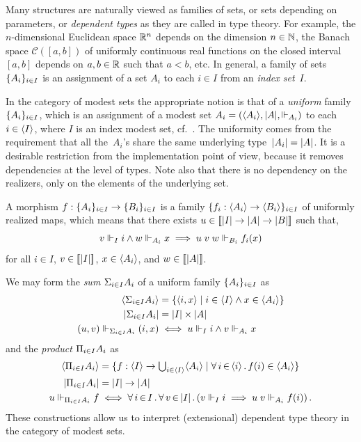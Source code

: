 Many structures are naturally viewed as families of sets, or sets
depending on parameters, or \emph{dependent types} as they are called
in type theory. For example, the $n$-dimensional Euclidean space
$\mathbb{R}^n$ depends on the dimension $n \in \mathbb{N}$, the Banach space
$\mathcal{C}([a,b])$ of uniformly continuous real functions on the
closed interval $[a,b]$ depends on $a, b \in \mathbb{R}$ such that $a < b$,
etc. In general, a family of sets $\{A_i\}_{i \in I}$ is an
assignment of a set $A_i$ to each $i \in I$ from an \emph{index
  set}~$I$.

In the category of modest sets the appropriate notion is that of a
\emph{uniform} family~$\{A_i\}_{i \in I}$, which is an assignment
of a modest set $A_i = (\langle A_i \rangle, |A|, {\Vdash_{A_i}})$ to each
$i \in \langle I \rangle$, where $I$ is an index modest set,
cf.~\cite{Jacobs,Birkedal}. The uniformity comes from the requirement
that all the~$A_i$'s share the same underlying type~$|A_i| =
|A|$. It is a desirable restriction from the implementation
point of view, because it removes dependencies at the level of types.
Note also that there is no dependency on the realizers, only on the
elements of the underlying set.

A morphism $f : \{A_i\}_{i \in I} \to \{B_i\}_{i \in I}$ is a
family $\{f_i : \langle A_i \rangle \to \langle B_i \rangle\}_{i \in I}$ of
uniformly realized maps, which means that there exists $u \in
[\![|I| \to |A| \to |B|]\!]$ such that,
%
\begin{equation*}
  v \Vdash_I i \land w \Vdash_{A_i} x \implies u\; v \; w \Vdash_{B_i} f_i(x)
\end{equation*}
%
for all $i \in I$, $v \in [\![|I|]\!]$, $x \in \langle A_i \rangle$,
and $w \in [\![|A|]\!]$.

We may form the \emph{sum} ${\Sigma_{i \in I} A_i}$ of a uniform family
$\{A_i\}_{i \in I}$ as
%
\begin{align*}
  \langle {\Sigma_{i \in I} A_i} \rangle &=
  \{\langle i,x \rangle \mid i \in \langle I \rangle \land x \in \langle A_i \rangle\}
  \\
  |{\Sigma_{i \in I} A_i}| &=
  |I| \times |A|
  \\
  (u,v) \Vdash_{{\Sigma_{i \in I} A_i}} (i,x)
  &\iff
  u \Vdash_I i \land v \Vdash_{A_i} x
\end{align*}
%
and the \emph{product} ${\Pi_{i \in I} A_i}$ as
%
\begin{align*}
  \langle {\Pi_{i \in I} A_i} \rangle &=
  \{f : \langle I \rangle \to {\textstyle \bigcup_{i \in \langle I \rangle} \langle A_i \rangle} \mid
    \forall\, i \,{\in}\, \langle i \rangle\,.\,f(i) \in \langle A_i \rangle\}
  \\
  |{\Pi_{i \in I} A_i}| &=
  |I| \to |A|
  \\
  u \Vdash_{{\Pi_{i \in I} A_i}} f
  &\iff
  \forall\, i \,{\in}\, I\,.\,\forall\, v \,{\in}\, |I|\,.\left(
      v \Vdash_I i \implies
      u \; v \Vdash_{A_i} f(i)
    \right).
\end{align*}
%
These constructions allow us to interpret (extensional) dependent type
theory in the category of modest sets.

